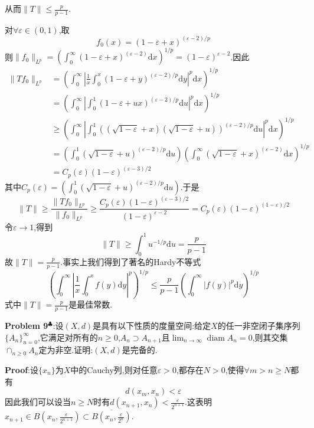 从而$\|T\|\leqslant \frac{p}{p-1}$.\par
对$\forall \varepsilon\in (0,1)$,取
$$
f_0(x)=(1-\varepsilon+x)^{(\varepsilon-2)/p}
$$
则$\|f_0\|_{L^p}=\left(\int_0^{\infty}(1-\varepsilon+x)^{(\varepsilon-2)}\mathrm{d}x\right)^{1/p}=(1-\varepsilon)^{\varepsilon-2}$.因此
$$
\begin{aligned}
    \|Tf_0\|_{L^p} &= \left(\int_0^{\infty}\left|\frac{1}{x}\int_0^x (1-\varepsilon+y)^{(\varepsilon-2)/p}\mathrm{d}y\right|^p\mathrm{d}x\right)^{1/p}\\
                   &= \left(\int_0^{\infty}\left|\int_0^1 (1-\varepsilon+ux)^{(\varepsilon-2)/p}\mathrm{d}u\right|^p\mathrm{d}x\right)^{1/p}\\
                   &\geqslant \left(\int_0^{\infty}\left|\int_0^1 \left((\sqrt{1-\varepsilon}+x)(\sqrt{1-\varepsilon}+u)\right)^{(\varepsilon-2)/p}\mathrm{d}u\right|^p\mathrm{d}x\right)^{1/p}\\
                   &= \left(\int_0^1(\sqrt{1-\varepsilon}+u)^{(\varepsilon-2)/p}\mathrm{d}u \right)\left(\int_0^{\infty}(\sqrt{1-\varepsilon}+x)^{(\varepsilon-2)}\mathrm{d}x \right)^{1/p}\\
                   &= C_p(\varepsilon)(1-\varepsilon)^{(\varepsilon-3)/2}
\end{aligned}
$$
其中$C_p(\varepsilon)=\left(\int_0^1(\sqrt{1-\varepsilon}+u)^{(\varepsilon-2)/p}\mathrm{d}u \right)$.于是
$$
\|T\|\geqslant \frac{\|Tf_0\|_{L^p}}{\|f_0\|_{L^p}}\geqslant \frac{C_p(\varepsilon)(1-\varepsilon)^{(\varepsilon-3)/2}}{(1-\varepsilon)^{\varepsilon-2}}=C_p(\varepsilon)(1-\varepsilon)^{(1-\varepsilon)/2}
$$
令$\varepsilon\to 1$,得到
$$
\|T\|\geqslant \int_0^1u^{-1/p}\mathrm{d}u=\frac{p}{p-1}
$$
故$\|T\|=\frac{p}{p-1}$.事实上我们得到了著名的Hardy不等式
$$
\left(\int_0^\infty\left|\frac{1}{x}\int_0^x f(y)\mathrm{d}y\right|^p\right)^{1/p}\leqslant \frac{p}{p-1}\left(\int_0^\infty|f(y)|^p\mathrm{d}y\right)^{1/p}
$$
式中$\|T\|=\frac{p}{p-1}$是最佳常数.\par
\textbf{Problem 9}$^\clubsuit $:设$(X,d)$是具有以下性质的度量空间:给定$X$的任一非空闭子集序列$\{A_n\}_{n=0}^{\infty}$,它满足对所有的$n\geqslant 0$,$A_n\supset A_{n+1}$且$\lim_{n\to\infty}\operatorname{diam}A_n=0$,则其交集$\cap_{n\geqslant 0}A_n$定为非空.证明:$(X,d)$是完备的.\par
\textbf{Proof}:设$\{x_n\}$为$X$中的Cauchy列,则对任意$\varepsilon>0$,都存在$N>0$,使得$\forall m>n\geqslant N$都有
$$
d(x_m,x_n)<\varepsilon
$$
因此我们可以设当$n\geqslant N$时有$d(x_{n+1},x_n)<\frac{\varepsilon}{2^{n+1}}$.这表明$x_{n+1}\in B(x_n,\frac{\varepsilon}{2^{n+1}})\subset \overline{B(x_n,\frac{\varepsilon}{2^n})}$.\par
